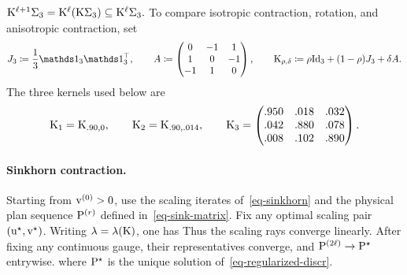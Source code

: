 \(\K^{\ell+1}\simplex_3 = \K^\ell(\K\simplex_3) \subseteq \K^\ell\simplex_3.\)
To compare isotropic contraction, rotation, and anisotropic contraction, set
\[
J_3\eqdef\frac{1}{3}\ones_3\ones_3^\top,
\qquad
A\eqdef
\begin{pmatrix}
0&-1&1\\
1&0&-1\\
-1&1&0
\end{pmatrix},
\qquad
\K_{\rho,\delta}\eqdef \rho\Id_3+(1-\rho)J_3+\delta A.
\]
The three kernels used below are
\[
\K_1=\K_{.90,0},
\qquad
\K_2=\K_{.90,.014},
\qquad
\K_3=
\begin{pmatrix}
.950&.018&.032\\
.042&.880&.078\\
.008&.102&.890
\end{pmatrix}.
\]
\paragraph{Sinkhorn contraction.}
\begin{thm}\label{thm-sinkhorn-hilbert-linear}
Starting from $\vD^{(0)}>0$, use the scaling iterates of~\eqref{eq-sinkhorn} and the physical plan sequence $\P^{(r)}$ defined in~\eqref{eq-sink-matrix}. Fix any optimal scaling pair $(\uD^\star,\vD^\star)$.
Writing $\la=\la(\K)$, one has
Thus the scaling rays converge linearly. After fixing any continuous gauge, their representatives converge, and $\P^{(2\ell)}\to\P^\star$ entrywise.
where $\P^\star$ is the unique solution of~\eqref{eq-regularized-discr}.
\end{thm}
